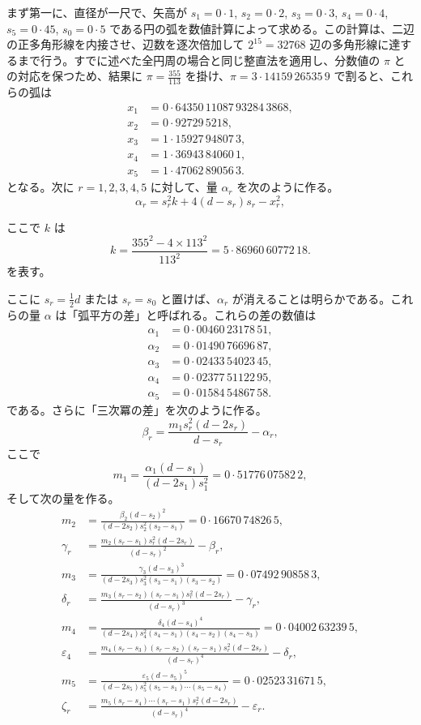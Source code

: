 \documentclass[11pt]{article}
\newcommand{\scanpage}[2]{\clearpage\setcounter{footnote}{0}\noindent{\footnotesize\color{gray}PDF #1 頁 · #2}\par\medskip}
\newcommand{\scanfooter}{}
\newcommand{\dd}{\mathbin{\cdot}}
\begin{document}
まず第一に、直径が一尺で、矢高が $s_1=0\dd1$, $s_2=0\dd2$, $s_3=0\dd3$, $s_4=0\dd4$, $s_5=0\dd45$, $s_0=0\dd5$ である円の弧を数値計算によって求める。この計算は、二辺の正多角形線を内接させ、辺数を逐次倍加して $2^{15}=32768$ 辺の多角形線に達するまで行う。すでに述べた全円周の場合と同じ整直法を適用し、分数値の $\pi$ との対応を保つため、結果に $\pi=\frac{355}{113}$ を掛け、$\pi=3\dd14159\,26535\,9$ で割ると、これらの弧は
\[
\begin{aligned}
x_1&=0\dd64350\,11087\,93284\,3868,\\
x_2&=0\dd92729\,5218,\\
x_3&=1\dd15927\,94807\,3,\\
x_4&=1\dd36943\,84060\,1,\\
x_5&=1\dd47062\,89056\,3.
\end{aligned}
\]
となる。次に $r=1,2,3,4,5$ に対して、量 $\alpha_r$ を次のように作る。
\[
\alpha_r=s_r^2k+4(d-s_r)s_r-x_r^2,
\]
\scanfooter

\scanpage{0225}{第28章、印刷頁211}
ここで $k$ は
\[
k=\frac{355^2-4\times113^2}{113^2}=5\dd86960\,60772\,18.
\]
を表す。

ここに $s_r=\frac12d$ または $s_r=s_0$ と置けば、$\alpha_r$ が消えることは明らかである。これらの量 $\alpha$ は「弧平方の差」と呼ばれる。これらの差の数値は
\[
\begin{aligned}
\alpha_1&=0\dd00460\,23178\,51,\\
\alpha_2&=0\dd01490\,76696\,87,\\
\alpha_3&=0\dd02433\,54023\,45,\\
\alpha_4&=0\dd02377\,51122\,95,\\
\alpha_5&=0\dd01584\,54867\,58.
\end{aligned}
\]
である。さらに「三次冪の差」を次のように作る。
\[
\beta_r=\frac{m_1s_r^2(d-2s_r)}{d-s_r}-\alpha_r,
\]
ここで
\[
m_1=\frac{\alpha_1(d-s_1)}{(d-2s_1)s_1^2}=0\dd51776\,07582\,2,
\]
そして次の量を作る。
\[
\begin{aligned}
m_2&=\frac{\beta_2(d-s_2)^2}{(d-2s_2)s_2^2(s_2-s_1)}=0\dd16670\,74826\,5,\\[1mm]
\gamma_r&=\frac{m_2(s_r-s_1)s_r^2(d-2s_r)}{(d-s_r)^2}-\beta_r,\\[1mm]
m_3&=\frac{\gamma_3(d-s_3)^3}{(d-2s_3)s_3^2(s_3-s_1)(s_3-s_2)}=0\dd07492\,90858\,3,\\[1mm]
\delta_r&=\frac{m_3(s_r-s_2)(s_r-s_1)s_r^2(d-2s_r)}{(d-s_r)^3}-\gamma_r,\\[1mm]
m_4&=\frac{\delta_4(d-s_4)^4}{(d-2s_4)s_4^2(s_4-s_1)(s_4-s_2)(s_4-s_3)}=0\dd04002\,63239\,5,\\[1mm]
\varepsilon_4&=\frac{m_4(s_r-s_3)(s_r-s_2)(s_r-s_1)s_r^2(d-2s_r)}{(d-s_r)^4}-\delta_r,\\[1mm]
m_5&=\frac{\varepsilon_5(d-s_5)^5}{(d-2s_5)s_5^2(s_5-s_1)\cdots(s_5-s_4)}=0\dd02523\,31671\,5,\\[1mm]
\zeta_r&=\frac{m_5(s_r-s_4)\cdots(s_r-s_1)s_r^2(d-2s_r)}{(d-s_r)^4}-\varepsilon_r.
\end{aligned}
\]
\end{document}

